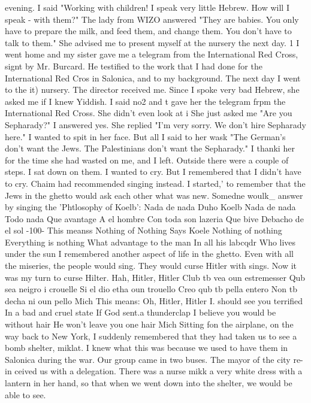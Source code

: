 {{evening.
I said "Working with children!
I speak very little Hebrew.
How will I speak - 
with them?"
The lady from WIZO answered "They are babies.
You only have to prepare the 
milk, and feed them, and change them.
You don't have to talk to them."
She advised me 
to present myself at the nursery the next day.
1 
I went home and my sister gave me a telegram from the International Red Cross, signt 
by Mr.
Burcard.
He testified to the work that I had done for the International Red Cros 
in Salonica, and to my background.
The next day I went to the it) nursery.
The director 
received me.
Since I spoke very bad Hebrew, she asked me if I knew Yiddish.
I said no2 
and t gave her the telegram frpm the International Red Cross.
She didn't even look at i 
She just asked me "Are you Sepharady?"
I answered yes.
She replied "I'm very sorry.
We don't hire Sepharady here."
I wanted to spit in her face.
But all I said to her wask 
"The German's don't want the Jews.
The Palestinians don't want the Sepharady."
I thanki 
her for the time she had wasted on me, and I left.
Outside there were a couple of steps.
I sat down on them.
I wanted to cry.
But I 
remembered that I didn't have to cry.
Chaim had recommended singing instead.
I started,' 
to remember that the Jews in the ghetto would ask each other what was new.
Somedne woulk_ 
answer by singing the 'Phtlosophy of Koelb': 
Nada de nada 
Duho Koelb 
Nada de nada 
Todo nada 
Que avantage 
A el hombre 
Con toda son lazeria 
Que bive 
Debacho de el sol 
-100- 
This meanss 
Nothing of Nothing 
Says Koele 
Nothing of nothing 
Everything is nothing 
What advantage to the man 
In all his labcqdr 
Who lives under the sun 
I remembered another aspect of life in the ghetto.
Even with all the miseries, the people 
would sing.
They would curse Hitler with sings.
Now it was my turn to curse Hilter.
Hah, Hitler, Hitler 
Club tb vea oun estremesser 
Qub sea neigro i crouelle 
Si el dio etha oun trouello 
Creo qub tb pella entero 
Non tb decha ni oun pello 
Mich 
This means: 
Oh, Hitler, Hitler 
I. should see you terrified 
In a bad and cruel state 
If God sent.a thunderclap 
I believe you would be without hair 
He won't leave you one hair 
Mich 
Sitting fon the airplane, on the way back to New York, I suddenly remembered that they 
had taken us to see a bomb shelter, miklat.
I knew what this was because we used to have 
them in Salonica during the war.
Our group came in two buses.
The mayor of the city re-in 
ceived us with a delegation.
There was a nurse mikk a very white dress with a lantern in 
her hand, so that when we went down into the shelter, we would be able to see.
}}
